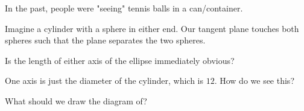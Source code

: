 



In the past, people were "seeing" tennis balls in a can/container. 

Imagine a cylinder with a sphere in either end. Our tangent plane touches both spheres such that the plane separates the two spheres.

Is the length of either axis of the ellipse immediately obvious?






One axis is just the diameter of the cylinder, which is $12.$ How do we see this?


What should we draw the diagram of?



